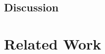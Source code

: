 \documentclass[conference]{IEEEtran}
\begin{document}
	

\subsection{Discussion}

\section{Related Work}
\end{document}
